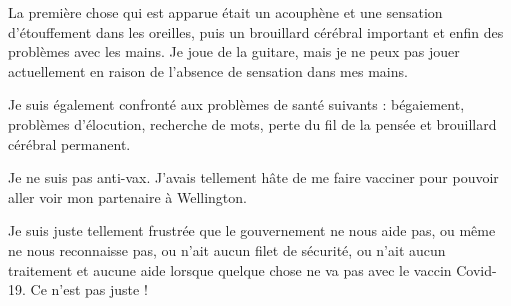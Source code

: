 La première chose qui est apparue était un acouphène et une sensation
d'étouffement dans les oreilles, puis un brouillard cérébral important et enfin
des problèmes avec les mains. Je joue de la guitare, mais je ne peux pas jouer
actuellement en raison de l'absence de sensation dans mes mains.

Je suis également confronté aux problèmes de santé suivants : bégaiement,
problèmes d'élocution, recherche de mots, perte du fil de la pensée et
brouillard cérébral permanent.

Je ne suis pas anti-vax. J'avais tellement hâte de me faire vacciner pour
pouvoir aller voir mon partenaire à Wellington.

Je suis juste tellement frustrée que le gouvernement ne nous aide pas, ou même
ne nous reconnaisse pas, ou n'ait aucun filet de sécurité, ou n'ait aucun
traitement et aucune aide lorsque quelque chose ne va pas avec le vaccin
Covid-19. Ce n'est pas juste !
